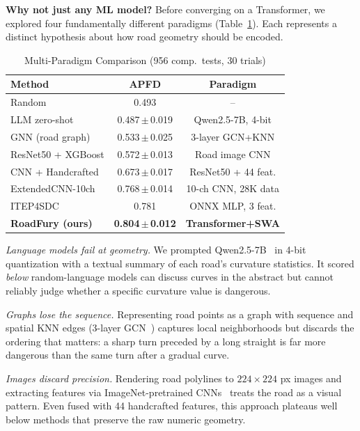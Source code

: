 ﻿\documentclass[conference]{IEEEtran}
\begin{document}
\textbf{Why not just any ML model?} Before converging on a Transformer, we explored four fundamentally different paradigms (Table~\ref{tab:results}). Each represents a distinct hypothesis about how road geometry should be encoded.

\begin{table}[t]
\caption{Multi-Paradigm Comparison (956 comp.\ tests, 30 trials)}
\vspace{-2pt}
\begin{center}{\small
\setlength{\tabcolsep}{3pt}
\begin{tabular}{lcc}
\toprule
\textbf{Method} & \textbf{APFD} & \textbf{Paradigm} \\
\midrule
Random                   & 0.493              & -- \\
LLM zero-shot            & 0.487\,$\pm$\,0.019 & Qwen2.5-7B, 4-bit \\
GNN (road graph)         & 0.533\,$\pm$\,0.025 & 3-layer GCN+KNN \\
ResNet50 + XGBoost       & 0.572\,$\pm$\,0.013 & Road image CNN \\
CNN + Handcrafted        & 0.673\,$\pm$\,0.017 & ResNet50 + 44 feat. \\
ExtendedCNN-10ch         & 0.768\,$\pm$\,0.014 & 10-ch CNN, 28K data \\
ITEP4SDC                 & 0.781              & ONNX MLP, 3 feat. \\
\textbf{RoadFury (ours)} & \textbf{0.804\,$\pm$\,0.012} & \textbf{Transformer+SWA} \\
\bottomrule
\end{tabular}}
\label{tab:results}
\end{center}
\vspace{-2pt}
\end{table}

\emph{Language models fail at geometry.} We prompted Qwen2.5-7B~\cite{b16} in 4-bit quantization with a textual summary of each road's curvature statistics. It scored \emph{below} random-language models can discuss curves in the abstract but cannot reliably judge whether a specific curvature value is dangerous.

\emph{Graphs lose the sequence.} Representing road points as a graph with sequence and spatial KNN edges (3-layer GCN~\cite{b21}) captures local neighborhoods but discards the ordering that matters: a sharp turn preceded by a long straight is far more dangerous than the same turn after a gradual curve.

\emph{Images discard precision.} Rendering road polylines to $224{\times}224$ px images and extracting features via ImageNet-pretrained CNNs~\cite{b5} treats the road as a visual pattern. Even fused with 44 handcrafted features, this approach plateaus well below methods that preserve the raw numeric geometry.
\end{document}
